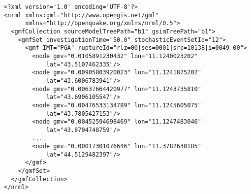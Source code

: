 \begin{Verbatim}[frame=single, commandchars=\\\{\}, fontsize=\small]
<?xml version='1.0' encoding='UTF-8'?>
<nrml xmlns:gml="http://www.opengis.net/gml"
      xmlns="http://openquake.org/xmlns/nrml/0.5">
  <gmfCollection sourceModelTreePath="b1" gsimTreePath="b1">
    <gmfSet investigationTime="50.0" stochasticEventSetId="12">
      <gmf IMT="PGA" ruptureId="rlz=00|ses=0001|src=10138|i=0049-00">
        <node gmv="0.0105891230432" lon="11.1240023202"
            lat="43.5107462335"/>
        <node gmv="0.00905803920023" lon="11.1241875202"
            lat="43.6006783941"/>
        <node gmv="0.00637664420977" lon="11.1243735810"
            lat="43.6906105547"/>
        <node gmv="0.00476533134789" lon="11.1245605075"
            lat="43.7805427153"/>
        <node gmv="0.00452594698469" lon="11.1247483046"
            lat="43.8704748759"/>
        ...
        <node gmv="0.00017301076646" lon="11.3782630185"
            lat="44.5129482397"/>
      </gmf>
    </gmfSet>
  </gmfCollection>
</nrml>
\end{Verbatim}